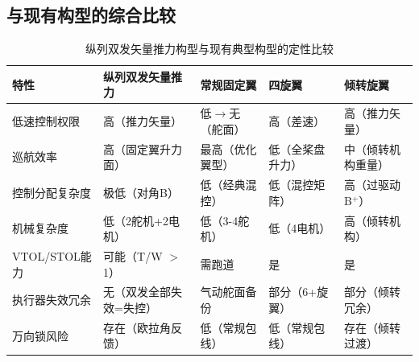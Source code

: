 \documentclass[a4paper,12pt]{ctexart}
\theoremstyle{plain}
\theoremstyle{definition}
\begin{document}
\subsection{与现有构型的综合比较}

\begin{table}[H]
\centering
\caption{纵列双发矢量推力构型与现有典型构型的定性比较}
\begin{tabular}{p{2.8cm}p{3cm}p{3cm}p{3cm}p{3cm}}
\toprule
\textbf{特性} & \textbf{纵列双发矢量推力} & \textbf{常规固定翼} & \textbf{四旋翼} & \textbf{倾转旋翼} \\
\midrule
低速控制权限 & 高（推力矢量） & 低$\to$无（舵面） & 高（差速） & 高（推力矢量） \\
巡航效率 & 高（固定翼升力面） & 最高（优化翼型） & 低（全桨盘升力） & 中（倾转机构重量） \\
控制分配复杂度 & 极低（对角B） & 低（经典混控） & 低（混控矩阵） & 高（过驱动B$^+$） \\
机械复杂度 & 低（2舵机+2电机） & 低（3-4舵机） & 低（4电机） & 高（倾转机构） \\
VTOL/STOL能力 & 可能（T/W $>$ 1） & 需跑道 & 是 & 是 \\
执行器失效冗余 & 无（双发全部失效=失控） & 气动舵面备份 & 部分（6+旋翼） & 部分（倾转冗余） \\
万向锁风险 & 存在（欧拉角反馈） & 低（常规包线） & 低（常规包线） & 存在（倾转过渡） \\
\bottomrule
\end{tabular}
\end{table}
\end{document}
